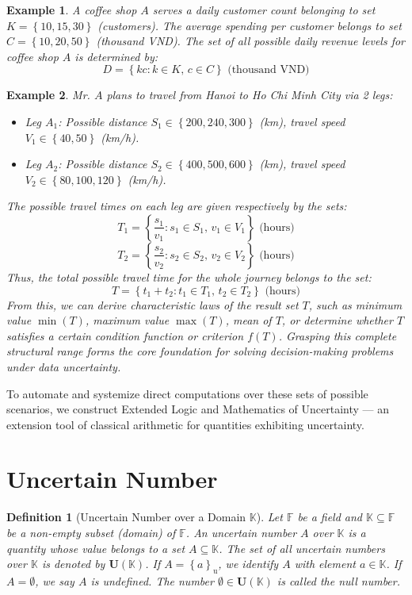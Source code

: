 \documentclass[a4paper,12pt,twoside]{memoir}
\newtheorem{definition}{Definition}[chapter]
\newtheorem{example}{Example}[chapter]
\newcommand{\set}[1]{\left\{#1\right\}} %
\newcommand{\s}[1]{\set{#1}_\mathrm{u}} %
\newcommand{\tsbd}[1]{\mathbf{U}(\mathbb{#1})}
\begin{document}
	\begin{example}
		A coffee shop $A$ serves a daily customer count belonging to set $K = \set{10, 15, 30}$ (customers). The average spending per customer belongs to set $C = \set{10, 20, 50}$ (thousand VND). The set of all possible daily revenue levels for coffee shop $A$ is determined by:
		\[
		D = \set{kc : k \in K, \, c \in C}  \text{ (thousand VND)}
		\]
	\end{example}
	
	\begin{example}
		Mr. $A$ plans to travel from Hanoi to Ho Chi Minh City via 2 legs:
		\begin{itemize}[leftmargin=*]
			\item Leg $A_1$: Possible distance $S_1 \in \set{200, 240, 300}$ (km), travel speed $V_1 \in \set{40, 50}$ (km/h).
			\item Leg $A_2$: Possible distance $S_2 \in \set{400, 500, 600}$ (km), travel speed $V_2 \in \set{80, 100, 120}$ (km/h).
		\end{itemize}
		The possible travel times on each leg are given respectively by the sets:
		\[
		T_1 = \set{\frac{s_1}{v_1} : s_1 \in S_1, \, v_1 \in V_1} \text{ (hours)}
		\]
		\[
		T_2 = \set{\frac{s_2}{v_2} : s_2 \in S_2, \, v_2 \in V_2}  \text{ (hours)}
		\]
		Thus, the total possible travel time for the whole journey belongs to the set:
		\[
		T = \set{t_1 + t_2 : t_1 \in T_1, \, t_2 \in T_2} \text{ (hours)}
		\]
		From this, we can derive characteristic laws of the result set $T$, such as minimum value $\min(T)$, maximum value $\max(T)$, mean of $T$, or determine whether $T$ satisfies a certain condition function or criterion $f(T)$. Grasping this complete structural range forms the core foundation for solving decision-making problems under data uncertainty.
	\end{example}
	
	To automate and systemize direct computations over these sets of possible scenarios, we construct Extended Logic and Mathematics of Uncertainty — an extension tool of classical arithmetic for quantities exhibiting uncertainty.
	
	\section{Uncertain Number}
	\begin{definition}[Uncertain Number over a Domain $\mathbb{K}$]
		Let $\mathbb{F}$ be a field and $\mathbb{K} \subseteq \mathbb{F}$ be a non-empty subset (domain) of $\mathbb{F}$. An uncertain number $A$ over $\mathbb{K}$ is a quantity whose value belongs to a set $A \subseteq \mathbb{K}$. The set of all uncertain numbers over $\mathbb{K}$ is denoted by $\tsbd{K}$. If $A =\s{a}$, we identify $A$ with element $a \in \mathbb{K}$. If $A =\emptyset$, we say $A$ is undefined. The number $\emptyset \in \tsbd{K}$ is called the null number.
	\end{definition}
	
\end{document}
